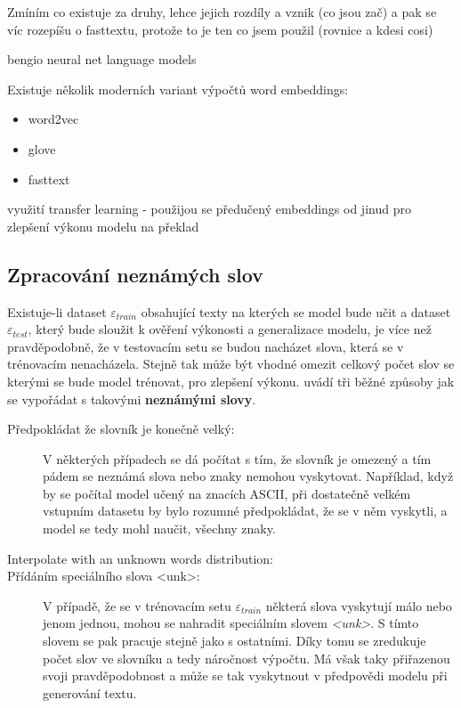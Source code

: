 


Zmíním co existuje za druhy, lehce jejich rozdíly a vznik (co jsou zač) a pak se víc rozepíšu o fasttextu, protože to je ten co jsem použil (rovnice a kdesi cosi)


bengio neural net language models\cite{Bengio:2008}


Existuje několik moderních variant výpočtů word embeddings:
\begin{itemize}
  \item word2vec \cite{word2vec}
  \item glove  \cite{glove}
  \item fasttext \cite{fasttext}
\end{itemize}

využití transfer learning - použijou se předučený embeddings od jinud pro zlepšení výkonu modelu na překlad

\subsection{Zpracování neznámých slov}
Existuje-li dataset $\varepsilon_{train}$ obsahující texty na kterých se model bude učit a dataset $\varepsilon_{test}$, který bude sloužit k ověření výkonosti a generalizace modelu, je více než pravděpodobně, že v testovacím setu se budou nacházet slova, která se v trénovacím nenacházela. Stejně tak může být vhodné omezit celkový počet slov se kterými se bude model trénovat, pro zlepšení výkonu. \cite{nmtTutorial} uvádí tři běžné způsoby jak se vypořádat s takovými \textbf{neznámými slovy}.

\begin{description}
  \item[Předpokládat že slovník je konečně velký:] V některých případech se dá počítat s tím, že slovník je omezený a tím pádem se neznámá slova nebo znaky nemohou vyskytovat. Například, když by se počítal model učený na znacích ASCII, při dostatečně velkém vstupním datasetu by bylo rozumné předpokládat, že se v něm vyskytli, a model se tedy mohl naučit, všechny znaky.
  \item[Interpolate with an unknown words distribution:] 
  \item[Přídáním speciálního slova <unk>:]\label{description:unk}V případě, že se v trénovacím setu $\varepsilon_{train}$ některá slova vyskytují málo nebo jenom jednou, mohou se nahradit speciálním slovem \emph{<unk>}. S tímto slovem se pak pracuje stejně jako s ostatními. Díky tomu se zredukuje počet slov ve slovníku a tedy náročnost výpočtu. Má však taky přiřazenou svoji pravděpodobnost a může se tak vyskytnout v předpovědi modelu při generování textu.
\end{description}

